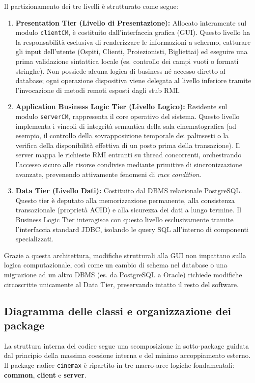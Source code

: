 \documentclass[12pt, a4paper]{article}
\begin{document}
Il partizionamento dei tre livelli è strutturato come segue:
\begin{enumerate}
    \item \textbf{Presentation Tier (Livello di Presentazione):} Allocato interamente sul modulo \texttt{clientCM}, è costituito dall'interfaccia grafica (GUI). Questo livello ha la responsabilità esclusiva di renderizzare le informazioni a schermo, catturare gli input dell'utente (Ospiti, Clienti, Proiezionisti, Bigliettai) ed eseguire una prima validazione sintattica locale (es. controllo dei campi vuoti o formati stringhe). Non possiede alcuna logica di business né accesso diretto al database; ogni operazione dispositiva viene delegata al livello inferiore tramite l'invocazione di metodi remoti esposti dagli stub RMI.
    \item \textbf{Application Business Logic Tier (Livello Logico):} Residente sul modulo \texttt{serverCM}, rappresenta il core operativo del sistema. Questo livello implementa i vincoli di integrità semantica della sala cinematografica (ad esempio, il controllo della sovrapposizione temporale dei palinsesti o la verifica della disponibilità effettiva di un posto prima della transazione). Il server mappa le richieste RMI entranti su thread concorrenti, orchestrando l'accesso sicuro alle risorse condivise mediante primitive di sincronizzazione avanzate, prevenendo attivamente fenomeni di \textit{race condition}.
    \item \textbf{Data Tier (Livello Dati):} Costituito dal DBMS relazionale PostgreSQL. Questo tier è deputato alla memorizzazione permanente, alla consistenza transazionale (proprietà ACID) e alla sicurezza dei dati a lungo termine. Il Business Logic Tier interagisce con questo livello esclusivamente tramite l'interfaccia standard JDBC, isolando le query SQL all'interno di componenti specializzati.
\end{enumerate}

Grazie a questa architettura, modifiche strutturali alla GUI non impattano sulla logica computazionale, così come un cambio di schema nel database o una migrazione ad un altro DBMS (es. da PostgreSQL a Oracle) richiede modifiche circoscritte unicamente al Data Tier, preservando intatto il resto del software.

\subsection{Diagramma delle classi e organizzazione dei package}
La struttura interna del codice segue una scomposizione in sotto-package guidata dal principio della massima coesione interna e del minimo accoppiamento esterno. Il package radice \texttt{cinemax} è ripartito in tre macro-aree logiche fondamentali: \textbf{common}, \textbf{client} e \textbf{server}.
\end{document}
